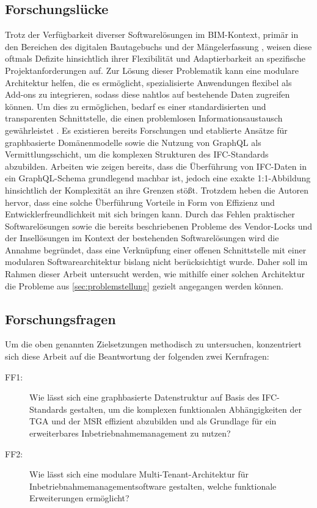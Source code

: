 \subsection{Forschungslücke}
Trotz der Verfügbarkeit diverser Softwarelösungen im BIM-Kontext, primär in den Bereichen des digitalen Bautagebuchs und der Mängelerfassung \cite[Kap.~4.2]{BBSR}, weisen diese oftmals Defizite hinsichtlich ihrer Flexibilität und Adaptierbarkeit an spezifische
Projektanforderungen auf. Zur Lösung dieser Problematik kann eine modulare Architektur helfen, die es ermöglicht, spezialisierte Anwendungen flexibel als Add-ons zu integrieren, sodass diese nahtlos auf bestehende Daten zugreifen können.
Um dies zu ermöglichen, bedarf es einer standardisierten und transparenten Schnittstelle, die einen problemlosen Informationsaustausch gewährleistet \cite[Kap.~4.1]{feth2023studie}.
Es existieren bereits Forschungen und etablierte Ansätze für graphbasierte Domänenmodelle sowie die Nutzung von GraphQL als Vermittlungsschicht, um die komplexen Strukturen des IFC-Standards abzubilden. Arbeiten wie \cite{wolf:2025:ifc2graphql} zeigen bereits,
dass die Überführung von IFC-Daten in ein GraphQL-Schema grundlegend machbar ist, jedoch eine exakte 1:1-Abbildung hinsichtlich der Komplexität an ihre Grenzen stößt. Trotzdem heben die Autoren hervor, dass eine solche Überführung Vorteile in Form von Effizienz
und Entwicklerfreundlichkeit mit sich bringen kann.
Durch das Fehlen praktischer Softwarelösungen sowie die bereits beschriebenen Probleme des Vendor-Locks und der Insellösungen im Kontext der bestehenden Softwarelösungen wird die Annahme begründet, dass eine Verknüpfung
einer offenen Schnittstelle mit einer modularen Softwarearchitektur bislang nicht berücksichtigt wurde. Daher soll im Rahmen dieser Arbeit untersucht werden, wie mithilfe einer solchen Architektur die Probleme aus \ref{sec:problemstellung}
gezielt angegangen werden können.
\subsection{Forschungsfragen}
Um die oben genannten Zielsetzungen methodisch zu untersuchen, konzentriert sich diese Arbeit auf die Beantwortung der folgenden zwei Kernfragen:
\begin{description}
    \item[FF1:] Wie lässt sich eine graphbasierte Datenstruktur auf Basis des IFC-Standards gestalten, um die komplexen funktionalen Abhängigkeiten der TGA und der MSR effizient abzubilden und als Grundlage für ein erweiterbares Inbetriebnahmemanagement zu nutzen?
    \item[FF2:] Wie lässt sich eine modulare Multi-Tenant-Architektur für Inbetriebnahmemanagementsoftware gestalten, welche funktionale Erweiterungen ermöglicht?
\end{description}
